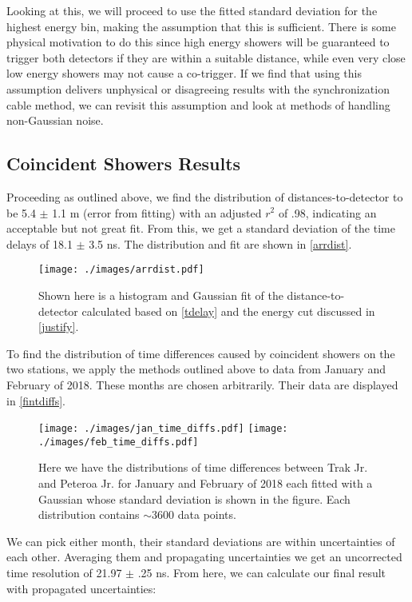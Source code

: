 Looking at this, we will proceed to use the fitted standard deviation for the highest energy bin, making the assumption that this is sufficient. There is some physical motivation to do this since high energy showers will be guaranteed to trigger both detectors if they are within a suitable distance, while even very close low energy showers may not cause a co-trigger. If we find that using this assumption delivers unphysical or disagreeing results with the synchronization cable method, we can revisit this assumption and look at methods of handling non-Gaussian noise. 
\subsection{Coincident Showers Results}
Proceeding as outlined above, we find the distribution of distances-to-detector to be 5.4 $\pm$ 1.1 m (error from fitting) with an adjusted $r^2$ of .98, indicating an acceptable but not great fit. From this, we get a standard deviation of the time delays of 18.1 $\pm$ 3.5 ns. The distribution and fit are shown in \autoref{arrdist}.
\begin{figure}[H]
\centering
\texttt{[image: ./images/arrdist.pdf]}
\caption[Distribution of Distances-to-Detector]{Shown here is a histogram and Gaussian fit of the distance-to-detector calculated based on \autoref{tdelay} and the energy cut discussed in \autoref{justify}.}
\label{arrdist}
\end{figure}
To find the distribution of time differences caused by coincident showers on the two stations, we apply the methods outlined above to data from January and February of 2018. These months are chosen arbitrarily. Their data are displayed in \autoref{fintdiffs}.
\begin{figure}[H]
\centering
\texttt{[image: ./images/jan\_time\_diffs.pdf]}
\texttt{[image: ./images/feb\_time\_diffs.pdf]}
\caption[Coincident Shower Time Differences]{Here we have the distributions of time differences between Trak Jr. and Peteroa Jr. for January and February of 2018 each fitted with a Gaussian whose standard deviation is shown in the figure. Each distribution contains $\sim$3600 data points.}
\label{fintdiffs}
\end{figure}
We can pick either month, their standard deviations are within uncertainties of each other. Averaging them and propagating uncertainties we get an uncorrected time resolution of 21.97 $\pm$ .25 ns. From here, we can calculate our final result with propagated uncertainties:
